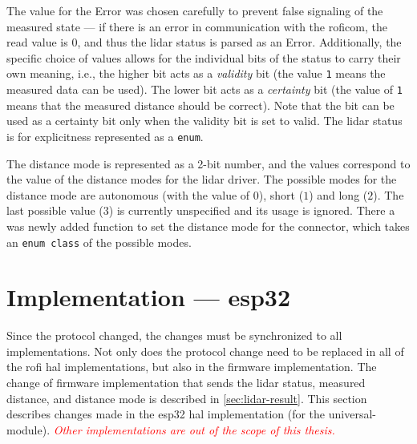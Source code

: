 \documentclass[
  digital,     %
  oneside,     %
  nosansbold,  %
  nocolorbold, %
  nolof,         %
  nolot,         %
]{fithesis4}
\newcommand{\TODO}[1]{\textcolor{red}{\textit{#1}}}
\newcommand{\TODOLIST}[1]{}
\begin{document}
{{{The value for the Error was chosen carefully to prevent false signaling of the measured state --- if there is an error in communication with the \acrshort{roficom}, the read value is $0$, and thus the \acrshort{lidar} status is parsed as an Error. Additionally, the specific choice of values allows for the individual bits of the status to carry their own meaning, i.e., the higher bit acts as a \emph{validity} bit (the value \verb|1| means the measured data can be used). The lower bit acts as a \emph{certainty} bit (the value of \verb|1| means that the measured distance should be correct). Note that the bit can be used as a certainty bit only when the validity bit is set to valid. The \acrshort{lidar} status is for explicitness represented as a \lstinline|enum|.

The distance mode is represented as a 2-bit number, and the values correspond to the value of the distance modes for the \acrshort{lidar} driver. The possible modes for the distance mode are autonomous (with the value of $0$), short ($1$) and long ($2$). The last possible value ($3$) is currently unspecified and its usage is ignored. There a was newly added function to set the distance mode for the connector, which takes an \lstinline|enum class| of the possible modes.

\section{ Implementation --- esp32 }
\TODOLIST{
\begin{itemize}
    \item Apply changes from interface --- lidar status, distance and \TODO{distance modes}
    \item Issue $\rightarrow$ status is not being updated $\rightarrow$ Needed to implement poller
\end{itemize}
}

Since the protocol changed, the changes must be synchronized to all implementations. Not only does the protocol change need to be replaced in all of the \acrshort{rofi} \acrshort{hal} implementations, but also in the firmware implementation. The change of firmware implementation that sends the \acrshort{lidar} status, measured distance, and distance mode is described in \autoref{sec:lidar-result}. This section describes changes made in the esp32 \acrshort{hal} implementation (for the \gls{universal-module}). \TODO{Other implementations are out of the scope of this thesis.}

}}}
\end{document}
